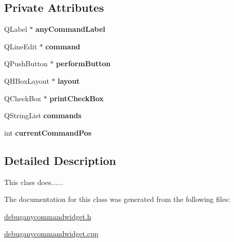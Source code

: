 \subsection*{Private Attributes}
\begin{DoxyCompactItemize}
\item 
\hypertarget{class_debug_any_command_widget_ad4a5fe865ba9660f6cbac6e09e2bd137}{}Q\+Label $\ast$ {\bfseries any\+Command\+Label}\label{class_debug_any_command_widget_ad4a5fe865ba9660f6cbac6e09e2bd137}

\item 
\hypertarget{class_debug_any_command_widget_ad19beab3fb6c3792df1da5ec017da3e9}{}Q\+Line\+Edit $\ast$ {\bfseries command}\label{class_debug_any_command_widget_ad19beab3fb6c3792df1da5ec017da3e9}

\item 
\hypertarget{class_debug_any_command_widget_a50311daaf991957f859463ca1ea5cf9b}{}Q\+Push\+Button $\ast$ {\bfseries perform\+Button}\label{class_debug_any_command_widget_a50311daaf991957f859463ca1ea5cf9b}

\item 
\hypertarget{class_debug_any_command_widget_a6dd7d633f09779a465218436d9bac391}{}Q\+H\+Box\+Layout $\ast$ {\bfseries layout}\label{class_debug_any_command_widget_a6dd7d633f09779a465218436d9bac391}

\item 
\hypertarget{class_debug_any_command_widget_a24fa59fe04b41dcdb695bb6aae7d94a1}{}Q\+Check\+Box $\ast$ {\bfseries print\+Check\+Box}\label{class_debug_any_command_widget_a24fa59fe04b41dcdb695bb6aae7d94a1}

\item 
\hypertarget{class_debug_any_command_widget_aa6e9673465d405354506a286f6e54075}{}Q\+String\+List {\bfseries commands}\label{class_debug_any_command_widget_aa6e9673465d405354506a286f6e54075}

\item 
\hypertarget{class_debug_any_command_widget_a1ba9dd8b19df99e7ae62598f31bcc6f9}{}int {\bfseries current\+Command\+Pos}\label{class_debug_any_command_widget_a1ba9dd8b19df99e7ae62598f31bcc6f9}

\end{DoxyCompactItemize}


\subsection{Detailed Description}
This class does...... 



The documentation for this class was generated from the following files\+:\begin{DoxyCompactItemize}
\item 
\hyperlink{debuganycommandwidget_8h}{debuganycommandwidget.\+h}\item 
\hyperlink{debuganycommandwidget_8cpp}{debuganycommandwidget.\+cpp}\end{DoxyCompactItemize}
